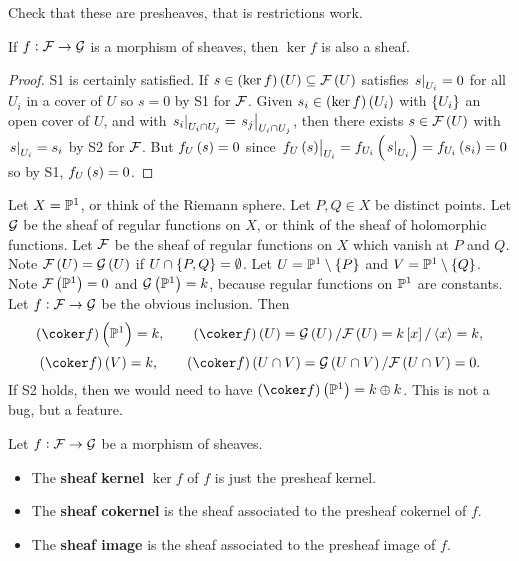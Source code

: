 \begin{exercise*}
Check that these are presheaves, that is restrictions work.
\end{exercise*}

\begin{remark}
If $ f : \mathcal{F} \to \mathcal{G} $ is a morphism of sheaves, then $ \ker f $ is also a sheaf.
\end{remark}

\begin{proof}
S1 is certainly satisfied. If $ s \in \br{\ker f}\br{U} \subseteq \FFF\br{U} $ satisfies $ \left. s \right|_{U_i} = 0 $ for all $ U_i $ in a cover of $ U $ so $ s = 0 $ by S1 for $ \mathcal{F} $. Given $ s_i \in \br{\ker f}\br{U_i} $ with $ \cbr{U_i} $ an open cover of $ U $, and with $ \left. s_i \right|_{U_i \cap U_j} = \left. s_j \right|_{U_i \cap U_j} $, then there exists $ s \in \FFF\br{U} $ with $ \left. s \right|_{U_i} = s_i $ by S2 for $ \mathcal{F} $. But $ f_U\br{s} = 0 $ since $ \eval{f_U\br{s}}_{U_i} = f_{U_i}\br{\eval{s}_{U_i}} = f_{U_i}\br{s_i} = 0 $ so by S1, $ f_U\br{s} = 0 $.
\end{proof}

\begin{example*}
Let $ X = \mathbb{P}^1 $, or think of the Riemann sphere. Let $ P, Q \in X $ be distinct points. Let $ \mathcal{G} $ be the sheaf of regular functions on $ X $, or think of the sheaf of holomorphic functions. Let $ \mathcal{F} $ be the sheaf of regular functions on $ X $ which vanish at $ P $ and $ Q $. Note $ \FFF\br{U} = \GGG\br{U} $ if $ U \cap \cbr{P, Q} = \emptyset $. Let $ U = \PP^1 \setminus \cbr{P} $ and $ V = \PP^1 \setminus \cbr{Q} $. Note $ \FFF\br{\PP^1} = 0 $ and $ \GGG\br{\PP^1} = k $, because regular functions on $ \mathbb{P}^1 $ are constants. Let $ f : \mathcal{F} \to \mathcal{G} $ be the obvious inclusion. Then
$$ \br{\coker f}\br{\PP^1} = k, \qquad \br{\coker f}\br{U} = \GGG\br{U} / \FFF\br{U} = k\sbr{x} / \abr{x} = k, $$
$$ \br{\coker f}\br{V} = k, \qquad \br{\coker f}\br{U \cap V} = \GGG\br{U \cap V} / \FFF\br{U \cap V} = 0. $$
If S2 holds, then we would need to have $ \br{\coker f}\br{\PP^1} = k \oplus k $. This is not a bug, but a feature.
\end{example*}

\begin{definition*}
Let $ f : \mathcal{F} \to \mathcal{G} $ be a morphism of sheaves.
\begin{itemize}
\item The \textbf{sheaf kernel} $ \ker f $ of $ f $ is just the presheaf kernel.
\item The \textbf{sheaf cokernel} is the sheaf associated to the presheaf cokernel of $ f $.
\item The \textbf{sheaf image} is the sheaf associated to the presheaf image of $ f $.
\end{itemize}
\end{definition*}

